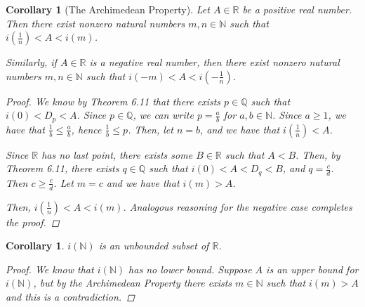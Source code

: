 \documentclass[11pt]{article}
\newcommand{\bbN}{\mathbb{N}}
\newcommand{\bbQ}{\mathbb{Q}}
\newcommand{\bbR}{\mathbb{R}}
\newtheorem{corollary}[theorem]{Corollary}
\theoremstyle{definition}
\numberwithin{equation}{subsection}
\begin{document}
\begin{corollary}[The Archimedean Property]
	Let $A \in \bbR$ be a positive real number. Then there exist nonzero natural numbers $m, n \in \bbN$ such that  $i(\frac{1}{n}) < A <i(m)$.
	
	Similarly, if $A\in\bbR$ is a negative real number, then there exist nonzero natural numbers $m,n\in\bbN$ such that $i(-m)<A<i(-\frac{1}{n}).$

\begin{proof}
We know by Theorem 6.11 that there exists $p \in \bbQ$ such that $i(0)<D_p<A$. Since $p \in \bbQ$, we can write $p = \frac{a}{b}$ for $a,b \in \bbN$. Since $a \geq 1$, we have that $\frac{1}{b} \leq \frac{a}{b}$, hence $\frac{1}{b} \leq p$. Then, let $n=b$, and we have that $i(\frac{1}{n}) < A$.

Since $\bbR$ has no last point, there exists some $B \in \bbR$ such that $A<B$. Then, by Theorem 6.11, there exists $q \in \bbQ$ such that $i(0)<A<D_q<B$, and $q = \frac{c}{d}$. Then $c \geq \frac{c}{d}$. Let $m=c$ and we have that $i(m)>A$. 

Then, $i(\frac{1}{n})<A<i(m)$. Analogous reasoning for the negative case completes the proof.

\renewcommand\qedsymbol{QED}
\end{proof}

\end{corollary}

\begin{corollary}
	$i(\bbN)$ is an unbounded subset of $\bbR$.

\begin{proof}
We know that $i(\bbN)$ has no lower bound. Suppose $A$ is an upper bound for $i(\bbN)$, but by the Archimedean Property there exists $m \in \bbN$ such that $i(m) > A$ and this is a contradiction.

\renewcommand\qedsymbol{QED}
\end{proof}

\end{corollary}
\end{document}
